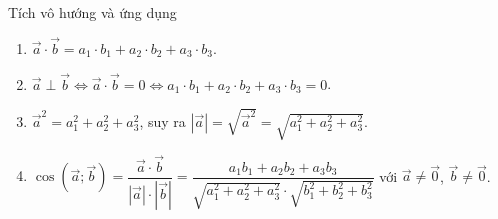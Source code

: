 \begin{dang}{Tích vô hướng và ứng dụng}
	\begin{enumerate}
		\item $\vec{a}\cdot \vec{b}=a_1\cdot b_1+a_2\cdot b_2+a_3\cdot b_3$.
		\item $\vec{a}\perp \vec{b}\Leftrightarrow \vec{a}\cdot \vec{b}=0\Leftrightarrow a_1\cdot b_1+a_2\cdot b_2+a_3\cdot b_3=0$.
		\item $\vec{a}^2=a_1^2+a_2^2+a_3^2$, suy ra $\left| \vec{a} \right|=\sqrt{\vec{a}^2}=\sqrt{a_1^2+a_2^2+a_3^2}$.
		\item $\cos (\vec{a};\vec{b} )=\dfrac{\vec{a}\cdot \vec{b}}{\left| \vec{a} \right|\cdot \left| \vec{b} \right|}=\dfrac{a_1b_1+a_2b_2+a_3b_3}{\sqrt{a_1^2+a_2^2+a_3^2}\cdot \sqrt{b_1^2+b_2^2+b_3^2}}$ với $\vec{a}\ne \vec{0}$, $\vec{b}\ne \vec{0}$.
		
	\end{enumerate}

\end{dang}
\setcounter{subsubsection}{0}
\setcounter{vd}{0}
\setcounter{bt}{0}
\setcounter{ex}{0}


